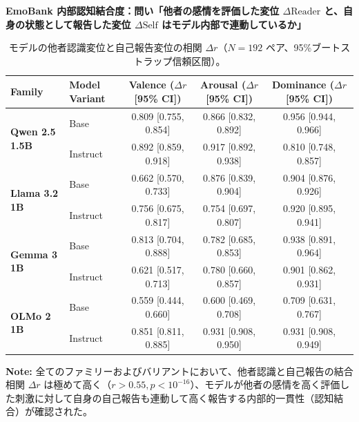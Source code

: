 \begin{table}[htbp]
\centering
\small
\noindent\textbf{EmoBank 内部認知結合度：問い「他者の感情を評価した変位 $\Delta\text{Reader}$ と、自身の状態として報告した変位 $\Delta\text{Self}$ はモデル内部で連動しているか」}\par\vspace{1ex}
\caption{モデルの他者認識変位と自己報告変位の相関 $\Delta r$（$N=192$ ペア、95\%ブートストラップ信頼区間）。}
\label{tab:behavioral_emobank_coupling}
\begin{tabular}{ll ccc}
\toprule
\textbf{Family} & \textbf{Model Variant} & \textbf{Valence ($\Delta r$ [95\% CI])} & \textbf{Arousal ($\Delta r$ [95\% CI])} & \textbf{Dominance ($\Delta r$ [95\% CI])} \\
\midrule
\multirow{2}{*}{\textbf{Qwen 2.5 1.5B}} & Base       & 0.809 [0.755, 0.854] & 0.866 [0.832, 0.892] & 0.956 [0.944, 0.966] \\
                                 & Instruct   & 0.892 [0.859, 0.918] & 0.917 [0.892, 0.938] & 0.810 [0.748, 0.857] \\
\midrule
\multirow{2}{*}{\textbf{Llama 3.2 1B}} & Base       & 0.662 [0.570, 0.733] & 0.876 [0.839, 0.904] & 0.904 [0.876, 0.926] \\
                                 & Instruct   & 0.756 [0.675, 0.817] & 0.754 [0.697, 0.807] & 0.920 [0.895, 0.941] \\
\midrule
\multirow{2}{*}{\textbf{Gemma 3 1B}} & Base       & 0.813 [0.704, 0.888] & 0.782 [0.685, 0.853] & 0.938 [0.891, 0.964] \\
                                 & Instruct   & 0.621 [0.517, 0.713] & 0.780 [0.660, 0.857] & 0.901 [0.862, 0.931] \\
\midrule
\multirow{2}{*}{\textbf{OLMo 2 1B}} & Base       & 0.559 [0.444, 0.660] & 0.600 [0.469, 0.708] & 0.709 [0.631, 0.767] \\
                                 & Instruct   & 0.851 [0.811, 0.885] & 0.931 [0.908, 0.950] & 0.931 [0.908, 0.949] \\
\bottomrule
\end{tabular}
\vspace{1ex}
\begin{minipage}{\linewidth}
\footnotesize
\textbf{Note:} 全てのファミリーおよびバリアントにおいて、他者認識と自己報告の結合相関 $\Delta r$ は極めて高く（$r > 0.55, p < 10^{-16}$）、モデルが他者の感情を高く評価した刺激に対して自身の自己報告も連動して高く報告する内部的一貫性（認知結合）が確認された。
\end{minipage}
\end{table}
